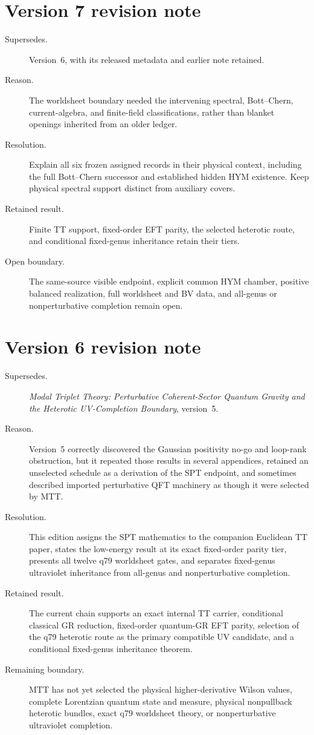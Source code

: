 \documentclass[11pt]{article}
\begin{document}
\section*{Version 7 revision note}
\begin{description}
\item[Supersedes.] Version~6, with its released metadata and earlier note retained.
\item[Reason.] The worldsheet boundary needed the intervening spectral,
Bott--Chern, current-algebra, and finite-field classifications, rather than
blanket openings inherited from an older ledger.
\item[Resolution.] Explain all six frozen assigned records in their physical
context, including the full Bott--Chern successor and established hidden HYM
existence. Keep physical spectral support distinct from auxiliary covers.
\item[Retained result.] Finite TT support, fixed-order EFT parity, the selected
heterotic route, and conditional fixed-genus inheritance retain their tiers.
\item[Open boundary.] The same-source visible endpoint, explicit common HYM
chamber, positive balanced realization, full worldsheet and BV data, and
all-genus or nonperturbative completion remain open.
\end{description}

\section*{Version 6 revision note}
\begin{description}
\item[Supersedes.] \emph{Modal Triplet Theory: Perturbative Coherent-Sector
Quantum Gravity and the Heterotic UV-Completion Boundary}, version~5.
\item[Reason.] Version~5 correctly discovered the Gaussian
positivity no-go and loop-rank obstruction, but it repeated those results in
several appendices, retained an unselected schedule as a derivation of the
SPT endpoint, and sometimes described imported perturbative QFT machinery as
though it were selected by MTT.
\item[Resolution.] This edition assigns the SPT mathematics to the companion
Euclidean TT paper, states the low-energy result at its exact fixed-order
parity tier, presents all twelve q79 worldsheet gates, and separates
fixed-genus ultraviolet inheritance from all-genus and nonperturbative
completion.
\item[Retained result.] The current chain supports an exact internal TT
carrier, conditional classical GR reduction, fixed-order quantum-GR EFT
parity, selection of the q79 heterotic route as the primary compatible UV
candidate, and a conditional fixed-genus inheritance theorem.
\item[Remaining boundary.] MTT has not yet selected the physical
higher-derivative Wilson values, complete Lorentzian quantum state and
measure, physical nonpullback heterotic bundles, exact q79 worldsheet theory,
or nonperturbative ultraviolet completion.
\end{description}
\end{document}
